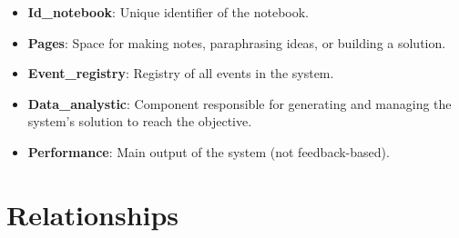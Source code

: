 \documentclass{article}
\begin{document}
\begin{itemize}[leftmargin=*]
    \item \textbf{\textbf{Id\_notebook}}: Unique identifier of the notebook.
    \item \textbf{\textbf{Pages}}: Space for making notes, paraphrasing ideas, or building a solution.
    \item \textbf{\textbf{Event\_registry}}: Registry of all events in the system.
    \item \textbf{\textbf{Data\_analystic}}: Component responsible for generating and managing the system’s solution to reach the objective.
    \item \textbf{\textbf{Performance}}: Main output of the system (not feedback-based).
\end{itemize}

\section*{Relationships}
\end{document}
